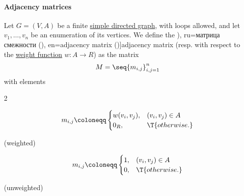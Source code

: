 \paragraph{Adjacency matrices}

\begin{definition}\label{def:graph_adjacency_matrix}
  Let \( G = (V, A) \) be a finite \hyperref[def:directed_graph]{simple directed graph}, with loops allowed, and let \( v_1, \ldots, v_n \) be an enumeration of its vertices. We define the  \term[bg=матрица на съседство (\cite[52]{Мирчев2001Графи}), ru=матрица смежности (\cite[27]{ЕмеличевИПр1990ТеорияГрафов}), en=adjacency matrix (\cite[27]{Diestel2017GraphTheory})]{adjacency matrix} (resp.  with respect to the \hyperref[def:weighted_set]{weight function} \( w: A \to R \)) as the matrix
  \begin{equation*}
    M = \seq{ m_{i,j} }_{i,j=1}^n
  \end{equation*}
  with elements
  \begin{paracol}{2}
    \begin{leftcolumn}
      \ParacolAlignmentHack
      \begin{equation*}
        m_{i,j} \coloneqq \begin{cases}
          w(v_i, v_j), &(v_i, v_j) \in A \\
          0_R,         &\T{otherwise.}
        \end{cases}
      \end{equation*}
      \begin{center}
        (weighted)
      \end{center}
    \end{leftcolumn}

    \begin{rightcolumn}
      \ParacolAlignmentHack
      \begin{equation*}
        m_{i,j} \coloneqq \begin{cases}
          1, &(v_i, v_j) \in A \\
          0, &\T{otherwise.}
        \end{cases}
      \end{equation*}
      \begin{center}
        (unweighted)
      \end{center}
    \end{rightcolumn}
  \end{paracol}
\end{definition}
